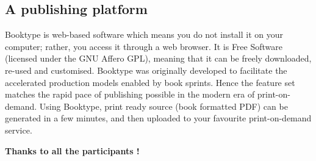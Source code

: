 \subsection{A publishing platform}

Booktype is web-based software which means you do not install it on your
computer; rather, you access it through a web browser. It is Free
Software (licensed under the GNU Affero GPL), meaning that it can be
freely downloaded, re-used and customised. Booktype was originally
developed to facilitate the accelerated production models enabled by
book sprints. Hence the feature set matches the rapid pace of
publishing possible in the modern era of print-on-demand. Using
Booktype, print ready source (book formatted PDF) can be generated in a
few minutes, and then uploaded to your favourite print-on-demand
service.

\textbf{Thanks to all the participants !}

